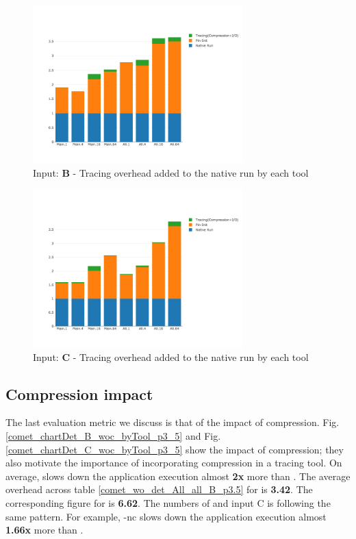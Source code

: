 \begin{figure}[t]
\centering
\includegraphics[width=3.2in]{figs.comet.newMed/comet_chartDet_B_wc_byTool_p3_5.png}
\caption{ Input: \textbf{B} - Tracing overhead added to the native run by each tool}
\label{comet_chartDet_B_wc_byTool_p3_5}
\end{figure}


\begin{figure}[t]
\centering
\includegraphics[width=3.2in]{figs.comet.newMed/comet_chartDet_C_wc_byTool_p3_5.png}
\caption{ Input: \textbf{C} - Tracing overhead added to the native run by each tool
}
\label{comet_chartDet_C_wc_byTool_p3_5}
\end{figure}






\subsection{Compression impact} 
\label{subsec:compact}

The last evaluation metric we discuss is that of the impact of compression.
%
Fig. \ref{comet_chartDet_B_woc_byTool_p3_5} and Fig. \ref{comet_chartDet_C_woc_byTool_p3_5} show the 
impact of compression; they also motivate the importance of incorporating compression in a tracing
tool. 
%
On average, \parlotnc slows down the application execution almost \textbf{2x} more than \parlota. 
%
The average overhead 
across table \ref{comet_wo_det_All_all_B_p3.5} for \parlota is \textbf{3.42}.
%
The  corresponding figure for \parlotnc is \textbf{6.62}. 
%
The numbers of \parlotm and input C is following the same pattern. For example, \parlot-nc slows down the application execution almost \textbf{1.66x} more than \parlotm.




